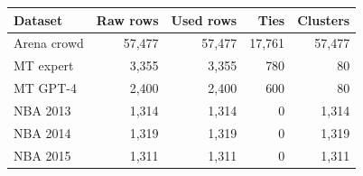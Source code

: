 \begin{tabular}{lrrrr}
\toprule
Dataset & Raw rows & Used rows & Ties & Clusters \\
\midrule
Arena crowd & 57,477 & 57,477 & 17,761 & 57,477 \\
MT expert & 3,355 & 3,355 & 780 & 80 \\
MT GPT-4 & 2,400 & 2,400 & 600 & 80 \\
NBA 2013 & 1,314 & 1,314 & 0 & 1,314 \\
NBA 2014 & 1,319 & 1,319 & 0 & 1,319 \\
NBA 2015 & 1,311 & 1,311 & 0 & 1,311 \\
\bottomrule
\end{tabular}
